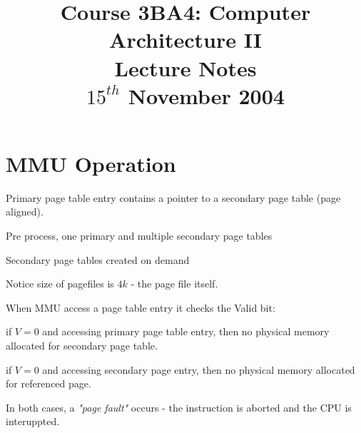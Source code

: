 \documentclass[a4paper,12pt]{article}
\begin{document}
\title{Course 3BA4: Computer Architecture II \\ Lecture Notes \\ $15^{th}$ November 2004}

\maketitle

\section*{MMU Operation}

Primary page table entry contains a pointer to a secondary page table
(page aligned).

Pre process, one primary and multiple secondary page tables

Secondary page tables created on demand

Notice size of pagefiles is $4k$ - the page file itself.


When MMU access a page table entry it checks the Valid bit:

\indent if $V = 0$ and accessing primary page table entry, then no
physical memory allocated for secondary page table.

\indent if $V = 0$ and accessing secondary page entry, then no physical
memory allocated for referenced page.


In both cases, a \emph{"page fault"} occurs - the instruction is aborted
and the CPU is interuppted.
\end{document}
